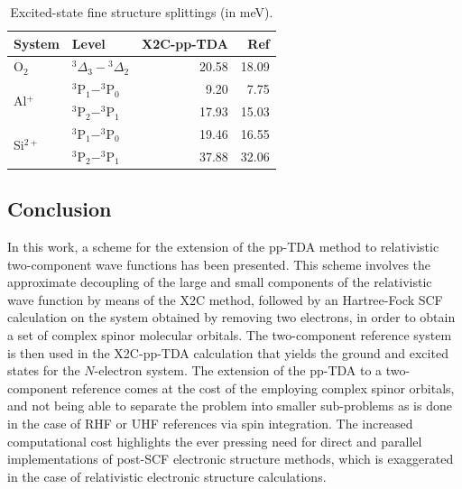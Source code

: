 \begin{table}[htbp]
 \caption{Excited-state fine structure splittings (in meV).}
 \label{tb:DoubleEx}
 \centering
 \begin{tabular}{llrr}
  \hline
  System & Level & X2C-pp-TDA & Ref \cite{NIST_ASD,Krupenie72_423} \\ \hline
  O$_2$ & $^3\Delta_3-{^3\Delta_2}$ & 20.58 & 18.09 \\ \hline
  \multirow{2}{*}{Al$^+$} & $^3$P$_1-^3$P$_0$ & 9.20 & 7.75 \\ 
  & $^3$P$_2-^3$P$_1$ & 17.93 & 15.03 \\  \hline
  \multirow{2}{*}{Si$^{2+}$} & $^3$P$_1-^3$P$_0$ & 19.46 & 16.55 \\ 
  & $^3$P$_2-^3$P$_1$ & 37.88 & 32.06 \\    \hline
 \end{tabular}
\end{table}

\subsection{Conclusion}

In this work, a scheme for the extension of the pp-TDA method to relativistic two-component wave functions has been presented.
This scheme involves the approximate decoupling of the large and small components of the relativistic wave function by means of the X2C method, followed by an Hartree-Fock SCF calculation on the system obtained by removing two electrons, in order to obtain a set of complex spinor molecular orbitals.
The two-component reference system is then used in the X2C-pp-TDA calculation that yields the ground and excited states for the $N$-electron system.
The extension of the pp-TDA to a two-component reference comes at the cost of the employing complex spinor orbitals, and not being able to separate the problem into smaller sub-problems as is done in the case of RHF or UHF references via spin integration.
The increased computational cost highlights the ever pressing need for direct and parallel implementations of post-SCF electronic structure methods, which is exaggerated in the case of relativistic electronic structure calculations.

